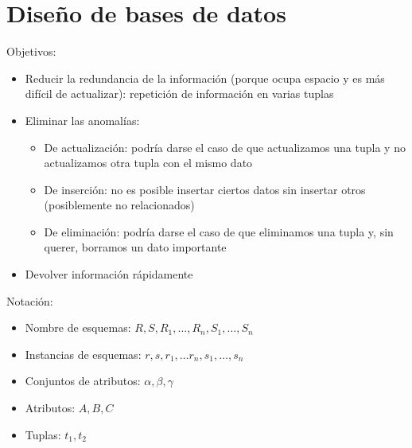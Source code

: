 \documentclass[a4paper, twoside]{article}
\begin{document}
\part{Diseño de bases de datos}
Objetivos:
\begin{itemize}
	\item Reducir la redundancia de la información (porque ocupa espacio y es más difícil de actualizar): repetición de información en varias tuplas
	\item Eliminar las anomalías:
	\begin{itemize}
		\item De actualización: podría darse el caso de que actualizamos una tupla y no actualizamos otra tupla con el mismo dato
		\item De inserción: no es posible insertar ciertos datos sin insertar otros (posiblemente no relacionados)
		\item De eliminación: podría darse el caso de que eliminamos una tupla y, sin querer, borramos un dato importante
	\end{itemize}
	\item Devolver información rápidamente
\end{itemize}

Notación:
\begin{itemize}
	\item Nombre de esquemas: $R,S,R_{1},\dots,R_{n},S_{1},\dots,S_{n}$
	\item Instancias de esquemas: $r,s,r_{1},\dots r_{n},s_{1},\dots,s_{n}$
	\item Conjuntos de atributos: $\alpha,\beta,\gamma$
	\item Atributos: $A,B,C$
	\item Tuplas: $t_{1},t_{2}$
\end{itemize}
\end{document}

